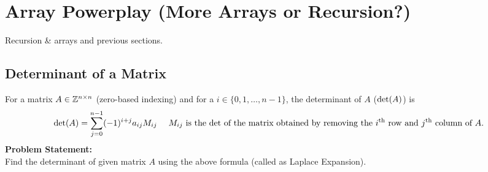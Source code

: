 \section{Array Powerplay (More Arrays or Recursion?)}
\begin{topics}
Recursion \& arrays and previous sections.
\end{topics}
\subsection{Determinant of a Matrix}
For a matrix $A\in \mathbb{Z}^{n\times n}$ (zero-based indexing) and for a $i\in\{0,1,\ldots,n-1\}$, the determinant of $A$ ($\operatorname{det}(A)$) is
\begin{equation}
\det(A)=\sum _{j=0}^{n-1}(-1)^{i+j}a_{ij}M_{ij}%
\quad \text{ $M_{ij}$ is the $\op{det}$ of the matrix obtained by removing the $i$\textsuperscript{th} row and $j$\textsuperscript{th} column of $A$.}%
\end{equation}
\textbf{Problem Statement:}\\
Find the determinant of given matrix $A$ using the above formula (called as Laplace Expansion).
